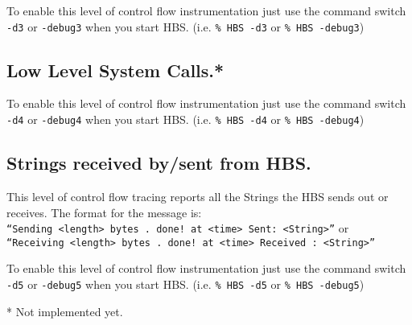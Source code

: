 To enable this level of control flow instrumentation just use the command
switch {\tt -d3} or {\tt -debug3}  when you start HBS. (i.e. {\tt \% HBS
-d3} or {\tt \% HBS -debug3})
\subsection{Low Level System Calls.*}

To enable this level of control flow instrumentation just use the command
switch {\tt -d4} or {\tt -debug4}  when you start HBS. (i.e. {\tt \% HBS
-d4} or {\tt \% HBS -debug4})
\subsection{Strings received by/sent from HBS.}
This level of control flow tracing reports all the Strings the HBS sends
out or receives.  The format for the message is: \\ {\tt ``Sending <length> bytes
. done! at <time> \\  Sent: <String>''} or \\ {\tt ``Receiving <length>
bytes . done! at <time> \\ Received : <String>''}

To enable this level of control flow instrumentation just use the command
switch {\tt -d5} or {\tt -debug5}  when you start HBS. (i.e. {\tt \% HBS
-d5} or {\tt \% HBS -debug5})



* Not implemented yet.


